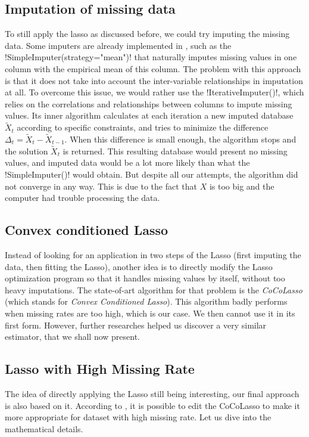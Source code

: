 \documentclass[]{article}
\begin{document}
\subsection{Imputation of missing data}
To still apply the lasso as discussed before, we could try imputing the missing data. Some imputers are already implemented in \sklearn, such as the \pyth!SimpleImputer(strategy="mean")! that naturally imputes missing values in one column with the empirical mean of this column. The problem with this approach is that it does not take into account the inter-variable relationships in imputation at all. To overcome this issue, we would rather use the \pyth!IterativeImputer()!, which relies on the correlations and relationships between columns to impute missing values. Its inner algorithm calculates at each iteration a new imputed database $\tilde{X}_t$ according to specific constraints, and tries to minimize the difference $\Delta_t = \tilde{X}_{t} - \tilde{X}_{t-1}$. When this difference is small enough, the algorithm stops and the solution $\tilde{X}_t$ is returned. This resulting database would present no missing values, and imputed data would be a lot more likely than what the \pyth!SimpleImputer()! would obtain. But despite all our attempts, the algorithm did not converge in any way. This is due to the fact that $X$ is too big and the computer had trouble processing the data.

\subsection{Convex conditioned Lasso}
Instead of looking for an application in two steps of the Lasso (first imputing the data, then fitting the Lasso), another idea is to directly modify the Lasso optimization program so that it handles missing values by itself, without too heavy imputations. The state-of-art algorithm for that problem is the \textit{CoCoLasso} (which stands for \textit{Convex Conditioned Lasso}). This algorithm badly performs when missing rates are too high, which is our case. We then cannot use it in its first form. However, further researches helped us discover a very similar estimator, that we shall now present.

\subsection{Lasso with High Missing Rate}
The idea of directly applying the Lasso still being interesting, our final approach is also based on it. According to 
\cite{hmlasso2019}, it is possible to edit the CoCoLasso to make it more appropriate for dataset with high missing rate. Let us dive into the mathematical details.\\
\end{document}
